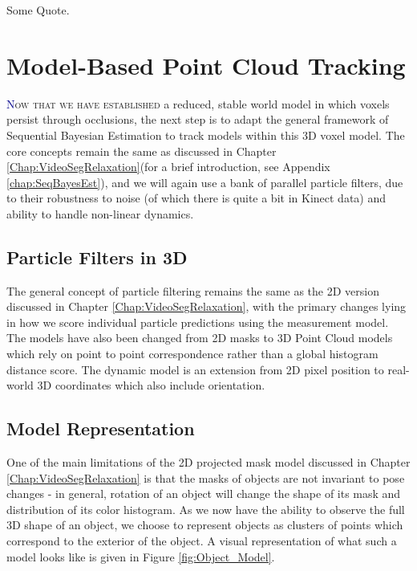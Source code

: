 \begin{savequote}[75mm]
Some Quote.
\end{savequote}

\chapter{Model-Based Point Cloud Tracking}
\label{Chap:ModelBasedTracking}
\lettrine[lines=3, loversize=0.3]{\textcolor{DarkBlue}N}{ow that we have established} a reduced, stable world model in which voxels persist through occlusions, the next step is to adapt the general framework of Sequential Bayesian Estimation to track models within this 3D voxel model. The core concepts remain the same as discussed in Chapter \ref{Chap:VideoSegRelaxation}(for a brief introduction, see Appendix \ref{chap:SeqBayesEst}), and we will again use a bank of parallel particle filters, due to their robustness to noise (of which there is quite a bit in Kinect data) and ability to handle non-linear dynamics.

\section{Particle Filters in 3D}
The general concept of particle filtering remains the same as the 2D version discussed in Chapter \ref{Chap:VideoSegRelaxation}, with the primary changes lying in how we score individual particle predictions using the measurement model. The models have also been changed from 2D masks to 3D Point Cloud models which rely on point to point correspondence rather than a global histogram distance score. The dynamic model is an extension from 2D pixel position to real-world 3D coordinates which also include orientation. 

\section{Model Representation}
One of the main limitations of the 2D projected mask model discussed in Chapter \ref{Chap:VideoSegRelaxation} is that the masks of objects are not invariant to pose changes - in general, rotation of an object will change the shape of its mask and distribution of its color histogram. As we now have the ability to observe the full 3D shape of an object, we choose to represent objects as clusters of points which correspond to the exterior of the object. A visual representation of what such a model looks like is given in Figure \ref{fig:Object_Model}.

